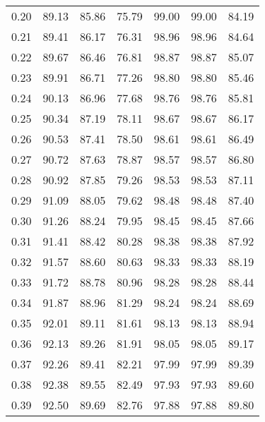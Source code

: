 \begin{tabular}{|c|c|c|c|c|c|c|}
      0.20 &     89.13 &     85.86 &      75.79 &   99.00 &      99.00 &         84.19 \\
      0.21 &     89.41 &     86.17 &      76.31 &   98.96 &      98.96 &         84.64 \\
      0.22 &     89.67 &     86.46 &      76.81 &   98.87 &      98.87 &         85.07 \\
      0.23 &     89.91 &     86.71 &      77.26 &   98.80 &      98.80 &         85.46 \\
      0.24 &     90.13 &     86.96 &      77.68 &   98.76 &      98.76 &         85.81 \\
      0.25 &     90.34 &     87.19 &      78.11 &   98.67 &      98.67 &         86.17 \\
      0.26 &     90.53 &     87.41 &      78.50 &   98.61 &      98.61 &         86.49 \\
      0.27 &     90.72 &     87.63 &      78.87 &   98.57 &      98.57 &         86.80 \\
      0.28 &     90.92 &     87.85 &      79.26 &   98.53 &      98.53 &         87.11 \\
      0.29 &     91.09 &     88.05 &      79.62 &   98.48 &      98.48 &         87.40 \\
      0.30 &     91.26 &     88.24 &      79.95 &   98.45 &      98.45 &         87.66 \\
      0.31 &     91.41 &     88.42 &      80.28 &   98.38 &      98.38 &         87.92 \\
      0.32 &     91.57 &     88.60 &      80.63 &   98.33 &      98.33 &         88.19 \\
      0.33 &     91.72 &     88.78 &      80.96 &   98.28 &      98.28 &         88.44 \\
      0.34 &     91.87 &     88.96 &      81.29 &   98.24 &      98.24 &         88.69 \\
      0.35 &     92.01 &     89.11 &      81.61 &   98.13 &      98.13 &         88.94 \\
      0.36 &     92.13 &     89.26 &      81.91 &   98.05 &      98.05 &         89.17 \\
      0.37 &     92.26 &     89.41 &      82.21 &   97.99 &      97.99 &         89.39 \\
      0.38 &     92.38 &     89.55 &      82.49 &   97.93 &      97.93 &         89.60 \\
      0.39 &     92.50 &     89.69 &      82.76 &   97.88 &      97.88 &         89.80 \\

\end{tabular}
